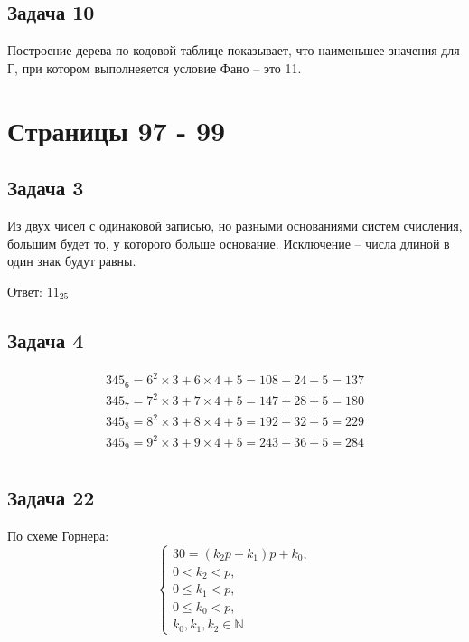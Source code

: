 \documentclass[12pt, a4paper]{article}
\begin{document}
  \subsection{Задача 10}
  Построение дерева по кодовой таблице показывает, что наименьшее значения для Г,
  при котором выполнеяется условие Фано -- это 11.

  \section{Страницы 97 - 99}
  \subsection{Задача 3}
  Из двух чисел с одинаковой записью, но разными основаниями систем счисления,
  большим будет то, у которого больше основание. Исключение -- числа длиной в 
  один знак будут равны.

  Ответ: $ 11_{25} $

  \subsection{Задача 4}
  \begin{equation*}
    \begin{gathered}
      345_{6} = 6^2 \times 3 + 6 \times 4 + 5 = 108 + 24 + 5 = 137 \\
      345_{7} = 7^2 \times 3 + 7 \times 4 + 5 = 147 + 28 + 5 = 180 \\
      345_{8} = 8^2 \times 3 + 8 \times 4 + 5 = 192 + 32 + 5 = 229 \\
      345_{9} = 9^2 \times 3 + 9 \times 4 + 5 = 243 + 36 + 5 = 284 \\
    \end{gathered}
  \end{equation*}

  \subsection{Задача 22}
  По схеме Горнера:
  \begin{equation}
    \label{eq:22gorner}
    \begin{cases}
      30 = (k_2p + k_1) p + k_0, \\
      0 < k_2 < p, \\
      0 \le k_1 < p, \\
      0 \le k_0 < p, \\
      k_0, k_1, k_2 \in \mathbb N 
    \end{cases}
  \end{equation}
 
\end{document}
